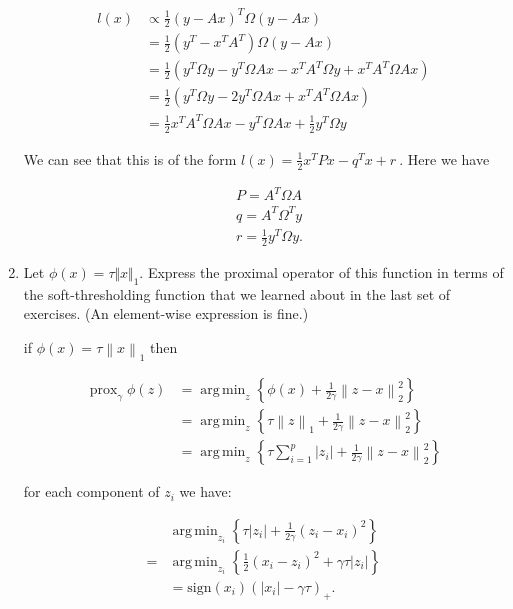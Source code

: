\documentclass{article}
\DeclareMathOperator*{\argmin}{arg\,min}
\DeclareMathOperator*{\prox}{prox}
\newcommand{\norm}[1]{\left\lVert#1\right\rVert}
\begin{document}
\begin{enumerate}[label=(\Alph*)]
{\begin{align}
		l(x) &\propto \frac{1}{2}(y - Ax)^T \Omega (y - Ax) \\
		&= \frac{1}{2}(y^T - x^TA^T)\Omega (y - Ax) \\
		&= \frac{1}{2}(y^T\Omega y - y^T\Omega Ax - x^TA^T\Omega y + x^TA^T\Omega Ax) \\
		&= \frac{1}{2}(y^T\Omega y - 2 y^T\Omega Ax + x^TA^T\Omega Ax) \\
		&= \frac{1}{2}x^TA^T\Omega Ax - y^T\Omega Ax + \frac{1}{2}y^T\Omega y 
\end{align}

We can see that this is of the form $l(x) = \frac{1}{2} x^{T} P x - q^{T} x + r \ $. Here we have 

\begin{tcolorbox}
\begin{align}
&P = A^T\Omega A\\
&q = A^T \Omega^T y\\ 
&r = \frac{1}{2}y^T \Omega y.
\end{align}
\end{tcolorbox}

}



\item  Let $\phi(x) = \tau \Vert x \Vert_1$.  Express the proximal operator of this function in terms of the soft-thresholding function that we learned about in the last set of exercises.  (An element-wise expression is fine.)

{\color{blue}
if $\phi(x) = \tau \norm{x}_1$ then

\begin{align}
\prox_{\gamma} \phi(z) &= \argmin_z \left \{ \phi(x) + \frac{1}{2\gamma} \norm{z-x}_2^2 \right \} \\
&= \argmin_z \left \{ \tau\norm{z}_1 + \frac{1}{2\gamma} \norm{z-x}_2^2 \right \} \\
&= \argmin_z \left \{ \tau \sum_{i = 1}^p |z_i| + \frac{1}{2\gamma} \norm{z-x}_2^2 \right \}
\end{align}


for each component of $z_i$ we have:

\begin{align}
&\argmin_{z_i} \left \{ \tau |z_i| + \frac{1}{2\gamma} (z_i-x_i)^2 \right \}\\
= &\argmin_{z_i} \left \{ \frac{1}{2} (x_i - z_i)^2 + \gamma \tau |z_i|  \right \}\\
&=\text{sign}(x_i)(|x_i| - \gamma\tau)_+.
\end{align}

}
\end{enumerate}
\end{document}
